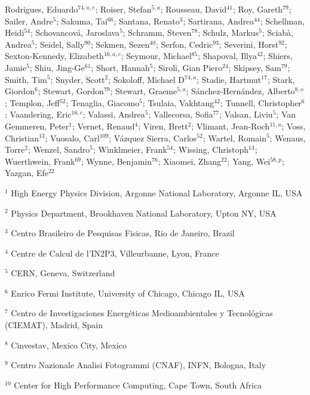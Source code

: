 Rodrigues, Eduardo$^{74,a,e}$;
Roiser, Stefan$^{5,a}$;
Rousseau, David$^{41}$;
Roy, Gareth$^{79}$;
Sailer, Andre$^{5}$;
Sakuma, Tai$^{66}$;
Santana, Renato$^{3}$;
Sartirana, Andrea$^{44}$;
Schellman, Heidi$^{54}$;
Schovancová, Jaroslava$^{5}$;
Schramm, Steven$^{78}$;
Schulz, Markus$^{5}$;
Sciabà, Andrea$^{5}$;
Seidel, Sally$^{90}$;
Sekmen, Sezen$^{40}$;
Serfon, Cedric$^{93}$;
Severini, Horst$^{92}$;
Sexton-Kennedy, Elizabeth$^{16,a,c}$;
Seymour, Michael$^{85}$;
Shapoval, Illya$^{42}$;
Shiers, Jamie$^{5}$;
Shiu, Jing-Ge$^{61}$;
Short, Hannah$^{5}$;
Siroli, Gian Piero$^{24}$;
Skipsey, Sam$^{79}$;
Smith, Tim$^{5}$;
Snyder, Scott$^{2}$;
Sokoloff, Michael D$^{74,a}$;
Stadie, Hartmut$^{17}$;
Stark, Giordon$^{6}$;
Stewart, Gordon$^{79}$;
Stewart, Graeme$^{5,a}$;
Sánchez-Hernández, Alberto$^{8,o}$;
Templon, Jeff$^{52}$;
Tenaglia, Giacomo$^{5}$;
Tsulaia, Vakhtang$^{42}$;
Tunnell, Christopher$^{6}$;
Vaandering, Eric$^{16,c}$;
Valassi, Andrea$^{5}$;
Vallecorsa, Sofia$^{77}$;
Valsan, Liviu$^{5}$;
Van Gemmeren, Peter$^{1}$;
Vernet, Renaud$^{4}$;
Viren, Brett$^{2}$;
Vlimant, Jean-Roch$^{11,a}$;
Voss, Christian$^{13}$;
Vuosalo, Carl$^{109}$;
Vázquez Sierra, Carlos$^{52}$;
Wartel, Romain$^{5}$;
Wenaus, Torre$^{2}$;
Wenzel, Sandro$^{5}$;
Winklmeier, Frank$^{54}$;
Wissing, Christoph$^{13}$;
Wuerthwein, Frank$^{69}$;
Wynne, Benjamin$^{76}$;
Xiaomei, Zhang$^{22}$;
Yang, Wei$^{58,p}$;
Yazgan, Efe$^{22}$
\bigskip
\par {\footnotesize $^{1}$ High Energy Physics Division, Argonne National Laboratory, Argonne IL, USA}
\par {\footnotesize $^{2}$ Physics Department, Brookhaven National Laboratory, Upton NY, USA}
\par {\footnotesize $^{3}$ Centro Brasileiro de Pesquisas Fisicas, Rio de Janeiro, Brazil}
\par {\footnotesize $^{4}$ Centre de Calcul de l’IN2P3, Villeurbanne, Lyon, France}
\par {\footnotesize $^{5}$ CERN, Geneva, Switzerland}
\par {\footnotesize $^{6}$ Enrico Fermi Institute, University of Chicago, Chicago IL, USA}
\par {\footnotesize $^{7}$ Centro de Investigaciones Energéticas Medioambientales y Tecnológicas (CIEMAT), Madrid, Spain}
\par {\footnotesize $^{8}$ Cinvestav, Mexico City, Mexico}
\par {\footnotesize $^{9}$ Centro Nazionale Analisi Fotogrammi (CNAF), INFN, Bologna, Italy}
\par {\footnotesize $^{10}$ Center for High Performance Computing, Cape Town, South Africa}
